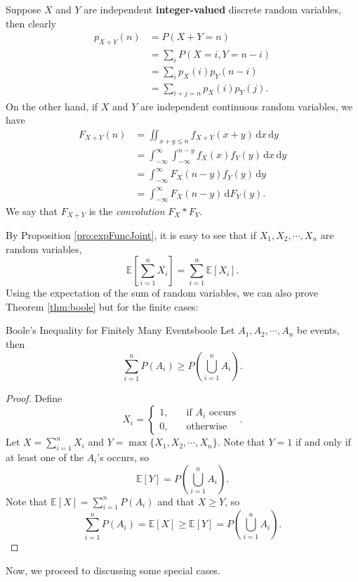 \documentclass[math]{amznotes}
\theoremstyle{remark}
\newcommand{\0}{\mathbf{0}}
\newcommand{\1}{\mathbf{1}}
\begin{document}
Suppose $X$ and $Y$ are independent \textbf{integer-valued} discrete random variables, then clearly
\begin{align*}
    p_{X + Y}(n) & = P(X + Y = n) \\
    & = \sum_{i}P(X = i, Y = n - i) \\
    & = \sum_{i}p_X(i)p_Y(n - i) \\
    & = \sum_{i + j = n}p_X(i)p_Y(j).
\end{align*}
On the other hand, if $X$ and $Y$ are independent continuous random variables, we have
\begin{align*}
    F_{X + Y}(n) & = \iint_{x + y \leq n}\!f_{X + Y}(x + y)\,\mathrm{d}x\,\mathrm{d}y \\
    & = \int_{-\infty}^{\infty}\int_{-\infty}^{n - y}\!f_X(x)f_Y(y)\,\mathrm{d}x\,\mathrm{d}y \\
    & = \int_{-\infty}^{\infty}\!F_X(n - y)f_Y(y)\,\mathrm{d}y \\
    & = \int_{-\infty}^{\infty}\!F_X(n - y)\,\mathrm{d}F_Y(y).
\end{align*}
We say that $F_{X + Y}$ is the \textit{convolution} $F_X * F_Y$.

By Proposition \ref{pro:expFuncJoint}, it is easy to see that if $X_1, X_2, \cdots, X_n$ are random variables,
\begin{equation*}
    \mathbb{E}\left[\sum_{i = 1}^{n}X_i\right] = \sum_{i = 1}^{n}\mathbb{E}[X_i].
\end{equation*}
Using the expectation of the sum of random variables, we can also prove Theorem \ref{thm:boole} but for the finite cases:
\begin{thmbox}{Boole's Inequality for Finitely Many Events}{boole}
    Let $A_1, A_2, \cdots, A_n$ be events, then 
    \begin{equation*}
        \sum_{i = 1}^{n}P(A_i) \geq P\left(\bigcup_{i = 1}^{n}A_i\right).
    \end{equation*}
    \tcblower       
    \begin{proof}
        Define
        \begin{equation*}
            X_i = \begin{cases}
                1, & \quad\textrm{if } A_i \textrm{ occurs} \\
                0, & \quad\textrm{otherwise}
            \end{cases}.
        \end{equation*}
        Let $X = \sum_{i = 1}^{n}X_i$ and $Y = \max\{X_1, X_2, \cdots, X_n\}$. Note that $Y = 1$ if and only if at least one of the $A_i$'s occurs, so 
        \begin{equation*}
            \mathbb{E}[Y] = P\left(\bigcup_{i = 1}^{n}A_i\right).
        \end{equation*}
        Note that $\mathbb{E}[X] = \sum_{i = 1}^{n}P(A_i)$ and that $X \geq Y$, so
        \begin{equation*}
            \sum_{i = 1}^{n}P(A_i) = \mathbb{E}[X] \geq \mathbb{E}[Y] = P\left(\bigcup_{i = 1}^{n}A_i\right).
        \end{equation*}
    \end{proof}
\end{thmbox}
Now, we proceed to discussing some special cases.
\end{document}
